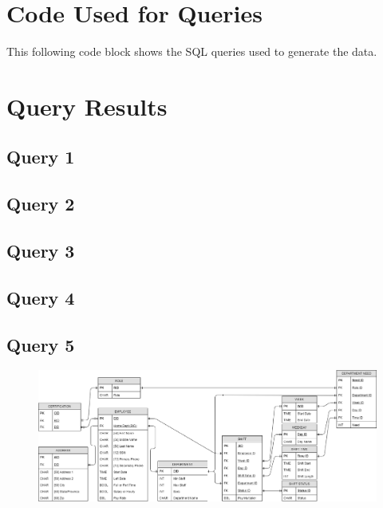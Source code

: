 \documentclass[letter,12pt]{texMemo}
\begin{document}
\maketitle

\section*{Code Used for Queries}
This following code block shows the SQL queries used to generate the data.


\section*{Query Results}
\subsection*{Query 1}


\subsection*{Query 2}


\subsection*{Query 3}


\subsection*{Query 4}


\subsection*{Query 5}


% 


%
%

\newpage
\begin{figure}[H]
	\centering
	\includegraphics[angle=90, height=\textheight]{er_diag.png}
\end{figure}
\end{document}
